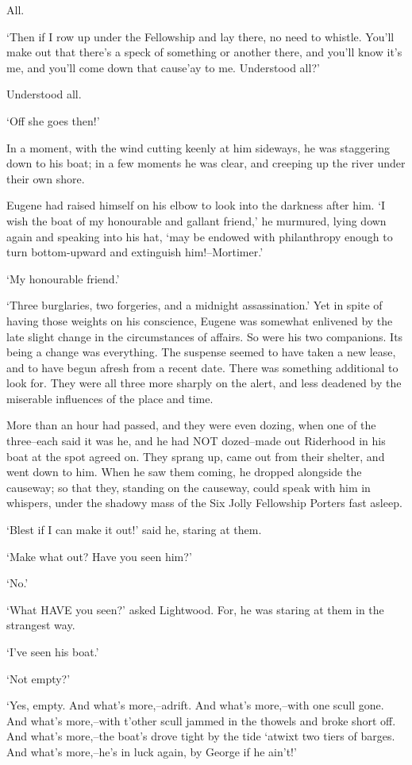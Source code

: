 All.

‘Then if I row up under the Fellowship and lay there, no need to
whistle. You’ll make out that there’s a speck of something or another
there, and you’ll know it’s me, and you’ll come down that cause’ay to
me. Understood all?’

Understood all.

‘Off she goes then!’

In a moment, with the wind cutting keenly at him sideways, he was
staggering down to his boat; in a few moments he was clear, and creeping
up the river under their own shore.

Eugene had raised himself on his elbow to look into the darkness after
him. ‘I wish the boat of my honourable and gallant friend,’ he murmured,
lying down again and speaking into his hat, ‘may be endowed
with philanthropy enough to turn bottom-upward and extinguish
him!--Mortimer.’

‘My honourable friend.’

‘Three burglaries, two forgeries, and a midnight assassination.’ Yet
in spite of having those weights on his conscience, Eugene was somewhat
enlivened by the late slight change in the circumstances of affairs. So
were his two companions. Its being a change was everything. The suspense
seemed to have taken a new lease, and to have begun afresh from a recent
date. There was something additional to look for. They were all three
more sharply on the alert, and less deadened by the miserable influences
of the place and time.

More than an hour had passed, and they were even dozing, when one of the
three--each said it was he, and he had NOT dozed--made out Riderhood
in his boat at the spot agreed on. They sprang up, came out from their
shelter, and went down to him. When he saw them coming, he dropped
alongside the causeway; so that they, standing on the causeway, could
speak with him in whispers, under the shadowy mass of the Six Jolly
Fellowship Porters fast asleep.

‘Blest if I can make it out!’ said he, staring at them.

‘Make what out? Have you seen him?’

‘No.’

‘What HAVE you seen?’ asked Lightwood. For, he was staring at them in
the strangest way.

‘I’ve seen his boat.’

‘Not empty?’

‘Yes, empty. And what’s more,--adrift. And what’s more,--with one scull
gone. And what’s more,--with t’other scull jammed in the thowels and
broke short off. And what’s more,--the boat’s drove tight by the tide
‘atwixt two tiers of barges. And what’s more,--he’s in luck again, by
George if he ain’t!’



